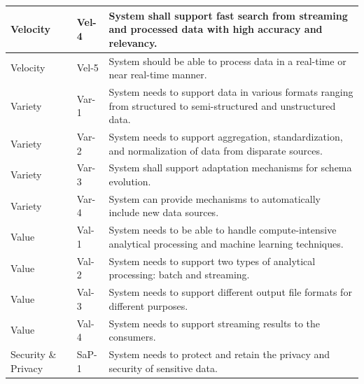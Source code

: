 \documentclass[review]{elsarticle}
\begin{document}
\begin{table}
\begin{tabular}{|l|l|p{10cm}|}
  \hline

  Velocity & Vel-4 & System shall support fast search from streaming and processed data with high accuracy and relevancy. \\

  \hline

  Velocity & Vel-5 & System should be able to process data in a real-time or near real-time manner. \\

  \hline

  Variety & Var-1 & System needs to support data in various formats ranging from structured to semi-structured and unstructured data. \\

  \hline

  Variety & Var-2 & System needs to support aggregation, standardization, and normalization of data from disparate sources. \\

  \hline

  Variety & Var-3 & System shall support adaptation mechanisms for schema evolution. \\

  \hline

  Variety & Var-4 & System can provide mechanisms to automatically include new data sources. \\

  \hline

  Value & Val-1 & System needs to be able to handle compute-intensive analytical processing and machine learning techniques. \\

  \hline

  Value & Val-2 & System needs to support two types of analytical processing: batch and streaming. \\

  \hline

  Value & Val-3 & System needs to support different output file formats for different purposes. \\

  \hline

  Value & Val-4 & System needs to support streaming results to the consumers. \\

  \hline

  Security \& Privacy & SaP-1 & System needs to protect and retain the privacy and security of sensitive data. \\


\end{tabular}
\end{table}
\end{document}
